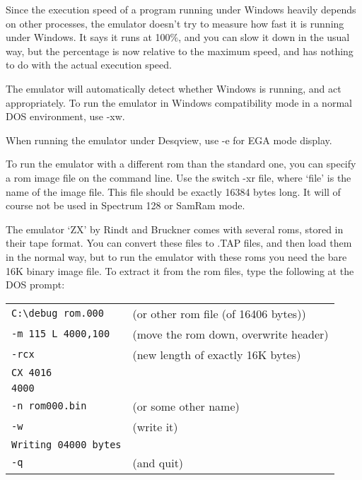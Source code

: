     Since the execution speed of a program running under Windows heavily
    depends on other processes, the emulator doesn't try to measure how fast
    it is running under Windows.  It says it runs at 100\%, and you can slow
    it down in the usual way, but the percentage is now relative to the
    maximum speed, and has nothing to do with the actual execution speed.

    The emulator will automatically detect whether Windows is running, and
    act appropriately.  To run the emulator in Windows compatibility mode in
    a normal DOS environment, use -xw.

    When running the emulator under Desqview, use -e for EGA mode display.

    To run the emulator with a different rom than the standard one, you can
    specify a rom image file on the command line.  Use the switch -xr file,
    where `file' is the name of the image file.  This file should be exactly
    16384 bytes long.  It will of course not be used in Spectrum 128 or
    SamRam mode.

    The emulator `ZX' by Rindt and Bruckner comes with several roms, stored
    in their tape format.  You can convert these files to .TAP files, and
    then load them in the normal way, but to run the emulator with these
    roms you need the bare 16K binary image file.  To extract it from the
    rom files, type the following at the DOS prompt:\\

\begin{tabular}{ll}
        \verb|C:\debug rom.000|     &   (or other rom file (of 16406 bytes))  \\
        \verb|-m 115 L 4000,100|    &   (move the rom down, overwrite header) \\
        \verb|-rcx|                 &   (new length of exactly 16K bytes)     \\
        \verb|CX 4016|              &                                         \\
        \verb|4000|                 &                                         \\
        \verb|-n rom000.bin|        &   (or some other name)                  \\
        \verb|-w|                   &   (write it)                            \\
        \verb|Writing 04000 bytes|  &                                         \\
        \verb|-q|                   &   (and quit)                            \\
\end{tabular}\\

